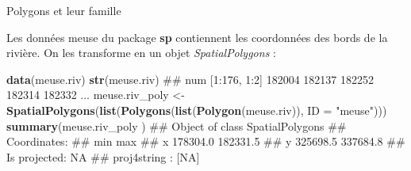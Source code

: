 \documentclass[8pt,ignorenonframetext,]{beamer}
\newenvironment{Shaded}{\begin{snugshade}}{\end{snugshade}}
\newcommand{\KeywordTok}[1]{\textcolor[rgb]{0.13,0.29,0.53}{\textbf{{#1}}}}
\newcommand{\DataTypeTok}[1]{\textcolor[rgb]{0.13,0.29,0.53}{{#1}}}
\newcommand{\StringTok}[1]{\textcolor[rgb]{0.31,0.60,0.02}{{#1}}}
\newcommand{\NormalTok}[1]{{#1}}
\begin{document}
\begin{frame}[fragile]{Polygons et leur famille}

Les données meuse du package \textbf{sp} contiennent les coordonnées des
bords de la rivière. On les transforme en un objet
\emph{SpatialPolygons} :

\begin{Shaded}
\begin{Highlighting}[]
\KeywordTok{data}\NormalTok{(meuse.riv)}
\KeywordTok{str}\NormalTok{(meuse.riv)}
\NormalTok{##  num [1:176, 1:2] 182004 182137 182252 182314 182332 ...}
\NormalTok{meuse.riv_poly <-}\StringTok{ }\KeywordTok{SpatialPolygons}\NormalTok{(}\KeywordTok{list}\NormalTok{(}\KeywordTok{Polygons}\NormalTok{(}\KeywordTok{list}\NormalTok{(}\KeywordTok{Polygon}\NormalTok{(meuse.riv)), }\DataTypeTok{ID =} \StringTok{"meuse"}\NormalTok{)))}
\KeywordTok{summary}\NormalTok{(meuse.riv_poly )}
\NormalTok{## Object of class SpatialPolygons}
\NormalTok{## Coordinates:}
\NormalTok{##        min      max}
\NormalTok{## x 178304.0 182331.5}
\NormalTok{## y 325698.5 337684.8}
\NormalTok{## Is projected: NA }
\NormalTok{## proj4string : [NA]}
\end{Highlighting}
\end{Shaded}

\end{frame}
\end{document}
